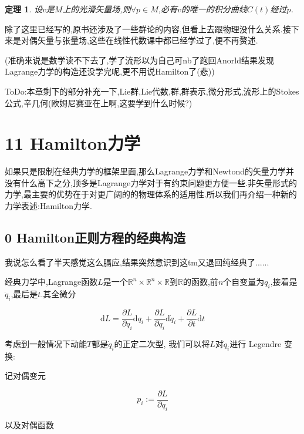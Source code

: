 \documentclass[UTF8]{article}
\newcommand{\D}{\mathrm{d}}
\begin{document}
	\newtheorem*{uniquenessOfIntegralCurve}{定理}
	
	\begin{uniquenessOfIntegralCurve}
		设$v$是$M$上的光滑矢量场,则$\forall p \in M$,必有$v$的唯一的积分曲线$C(t)$经过$p$.
	\end{uniquenessOfIntegralCurve}
	
	除了这里已经写的,原书还涉及了一些群论的内容,但看上去跟物理没什么关系.接下来是对偶矢量与张量场,这些在线性代数课中都已经学过了,便不再赘述.
	
	(准确来说是数学读不下去了,学了流形以为自己可nb了跑回Anorld结果发现Lagrange力学的构造还没学完呢,更不用说Hamilton了(悲))
	
	ToDo:本章剩下的部分补充一下,Lie群,Lie代数,群,群表示,微分形式,流形上的Stokes公式,辛几何(欧姆尼赛亚在上啊,这要学到什么时候?)
	
	
	
	
	
	
	\newpage
	
	
\section*{11 Hamilton力学}
	
	如果只是限制在经典力学的框架里面,那么Lagrange力学和Newtond的矢量力学并没有什么高下之分,顶多是Lagrange力学对于有约束问题更方便一些.非矢量形式的力学,最主要的优势在于对更广阔的的物理体系的适用性.所以我们再介绍一种新的力学表述:Hamilton力学.
	
\subsection*{0 Hamilton正则方程的经典构造}
	
	我说怎么看了半天感觉这么膈应,结果突然意识到这tm又退回纯经典了......
	
	经典力学中,Lagrange函数$L$是一个$\mathbb{R}^n \times \mathbb{R}^n \times \mathbb{R}$到$\mathbb{R}$的函数,前$n$个自变量为$q_{i}$,接着是$\dot{q}_{i}$,最后是$t$.其全微分
	
	\[\D L = \frac{\partial L}{\partial q_{i}} \D q_{i} + \frac{\partial L}{\partial \dot{q}_{i}} \D \dot{q}_{i} + \frac{\partial L}{\partial t} \D t\]
	
	考虑到一般情况下动能$T$都是$\dot{q}_{i}$的正定二次型, 我们可以将$L$对$\dot{q}_{i}$进行 Legendre 变换:
	
	记对偶变元
	
	\[p_{i} := \frac{\partial L}{\partial \dot{q}_{i}}\]
	
	以及对偶函数
	
\end{document}
